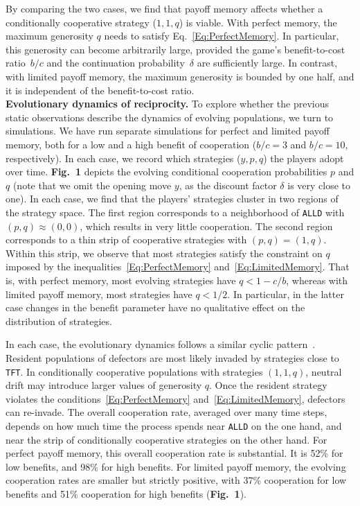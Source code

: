 \documentclass[11pt]{article}
\def\alld{\texttt{ALLD}}
\def\tft{\texttt{TFT}}
\newcommand{\FigBaseResults}{{\bf Fig.~1}}
\theoremstyle{plainCl1}
\theoremstyle{plainCl2}
\begin{document}

By comparing the two cases, we find that payoff memory affects whether a conditionally cooperative strategy ($1,1,q$) is viable. 
With perfect memory, the maximum generosity $q$ needs to satisfy Eq.~\eqref{Eq:PerfectMemory}.
In particular, this generosity can become arbitrarily large, provided the game's benefit-to-cost ratio~$b/c$ and the continuation probability~$\delta$ are sufficiently large. 
In contrast, with limited payoff memory, the maximum generosity is bounded by one half, and it is independent of the benefit-to-cost ratio.\\



\noindent
{\bf Evolutionary dynamics of reciprocity.}
To explore whether the previous static observations describe the dynamics of evolving populations, we turn to simulations.
We have run separate simulations for perfect and limited payoff memory, both for a low and a high benefit of cooperation ($b/c\!=\!3$ and $b/c\!=\!10$, respectively).  
In each case, we record which strategies ($y,p,q$) the players adopt over time.
\FigBaseResults{} depicts the evolving conditional cooperation probabilities $p$ and $q$ (note that we omit the opening move \(y\), as the discount factor \(\delta\) is very close to one). 
In each case, we find that the players' strategies cluster in two regions of the strategy space. 
The first region corresponds to a neighborhood of \alld{} with $(p,q)\!\approx\!(0,0)$, which results in very little cooperation. 
The second region corresponds to a thin strip of cooperative strategies with $(p,q)\!=\!(1,q)$. 
Within this strip, we observe that most strategies satisfy the constraint on $q$ imposed by the inequalities~\eqref{Eq:PerfectMemory} and~\eqref{Eq:LimitedMemory}. 
That is, with perfect memory, most evolving strategies have $q\!<\!1\!-\!c/b$, whereas with limited payoff memory, most strategies have $q\!<\!1/2$. 
In particular, in the latter case changes in the benefit parameter have no qualitative effect on the distribution of strategies. 


In each case, the evolutionary dynamics follows a similar cyclic pattern~\citep[as previously described in Refs.][]{imhof2010stochastic, Nowak1992tit}.
Resident populations of defectors are most likely invaded by strategies close to \tft. 
In conditionally cooperative populations with strategies $(1,1,q)$, neutral drift may introduce larger values of generosity $q$. 
Once the resident strategy violates the conditions~\eqref{Eq:PerfectMemory} and~\eqref{Eq:LimitedMemory}, defectors can re-invade. 
The overall cooperation rate, averaged over many time steps, depends on how much time the process spends near \alld{} on the one hand, and near the strip of conditionally cooperative strategies on the other hand. 
For perfect payoff memory, this overall cooperation rate is substantial. 
It is 52\% for low benefits, and 98\% for high benefits. 
For limited payoff memory, the evolving cooperation rates are smaller but strictly positive, with 37\% cooperation for low benefits and 51\% cooperation for high benefits (\FigBaseResults). 
\end{document}
